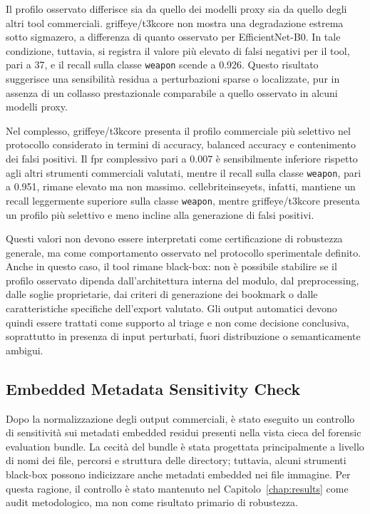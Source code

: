 Il profilo osservato differisce sia da quello dei modelli proxy sia da quello
degli altri tool commerciali. \gls{griffeye}/\gls{t3kcore} non mostra una
degradazione estrema sotto \gls{sigmazero}, a differenza di quanto osservato per
EfficientNet-B0. In tale condizione, tuttavia, si registra il valore più elevato
di falsi negativi per il tool, pari a 37, e il recall sulla classe
\texttt{weapon} scende a 0.926. Questo risultato suggerisce una sensibilità
residua a perturbazioni sparse o localizzate, pur in assenza di un collasso
prestazionale comparabile a quello osservato in alcuni modelli proxy.

Nel complesso, \gls{griffeye}/\gls{t3kcore} presenta il profilo commerciale più selettivo nel protocollo
considerato in termini di accuracy, balanced accuracy e contenimento
dei falsi positivi. Il \gls{fpr} complessivo pari a 0.007 è sensibilmente
inferiore rispetto agli altri strumenti commerciali valutati, mentre il recall
sulla classe \texttt{weapon}, pari a 0.951, rimane elevato ma non massimo.
\gls{cellebriteinseyets}, infatti, mantiene un recall leggermente superiore sulla
classe \texttt{weapon}, mentre \gls{griffeye}/\gls{t3kcore} presenta un profilo
più selettivo e meno incline alla generazione di falsi positivi.

Questi valori non devono essere interpretati come certificazione di robustezza
generale, ma come comportamento osservato nel protocollo sperimentale definito.
Anche in questo caso, il tool rimane black-box: non è possibile stabilire se il
profilo osservato dipenda dall'architettura interna del modulo, dal
preprocessing, dalle soglie proprietarie, dai criteri di generazione dei
bookmark o dalle caratteristiche specifiche dell'export valutato. Gli output
automatici devono quindi essere trattati come supporto al triage e non come
decisione conclusiva, soprattutto in presenza di input perturbati, fuori
distribuzione o semanticamente ambigui.




\subsection{Embedded Metadata Sensitivity Check}
\label{subsec:results-embedded-metadata-sensitivity}

Dopo la normalizzazione degli output commerciali, è stato eseguito un controllo
di sensitività sui metadati embedded residui presenti nella vista cieca del
forensic evaluation bundle. La cecità del bundle è stata progettata
principalmente a livello di nomi dei file, percorsi e struttura delle directory;
tuttavia, alcuni strumenti black-box possono indicizzare anche metadati embedded
nei file immagine. Per questa ragione, il controllo è stato mantenuto nel
Capitolo~\ref{chap:results} come audit metodologico, ma non come risultato
primario di robustezza.


